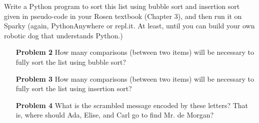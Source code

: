 \documentclass{article}
\begin{document}
Write a Python program to sort this list using bubble sort and insertion
sort given in pseudo-code in your Rosen textbook (Chapter 3), and then run it
on Sparky (again, PythonAnywhere or repl.it. At least, until you can build
your own robotic dog that understands Python.)

\begin{enumerate}
\item[\textbf{Problem 2}] How many comparisons (between two items) will be necessary to fully
sort the list using bubble sort?
\item[\textbf{Problem 3}] How many comparisons (between two items) will be necessary to fully
sort the list using insertion sort?
\item[\textbf{Problem 4}] What is the scrambled message encoded by these letters?
That is, where should Ada, Elise, and Carl go to find Mr. de Morgan?
\end{enumerate}
\end{document}

